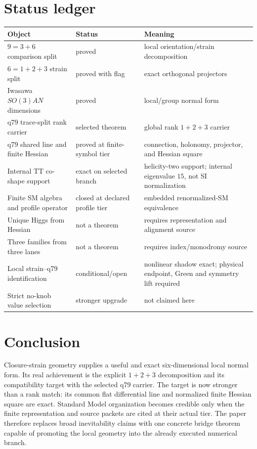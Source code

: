 \documentclass[11pt]{article}
\begin{document}
\section{Status ledger}

\begin{center}
\small
\renewcommand{\arraystretch}{1.16}
\begin{tabularx}{\textwidth}{@{}
 >{\raggedright\arraybackslash}p{}
 >{\raggedright\arraybackslash}p{}
 >{\raggedright\arraybackslash}X@{}}
\hline
Object & Status & Meaning\\
\hline
$9=3+6$ comparison split & proved & local orientation/strain decomposition\\
$6=1+2+3$ strain split & proved with flag & exact orthogonal projectors\\
Iwasawa $SO(3)AN$ dimensions & proved & local/group normal form\\
q79 trace-split rank carrier & selected theorem & global rank $1+2+3$ carrier\\
q79 shared line and finite Hessian & proved at finite-symbol tier & connection,
holonomy, projector, and Hessian square\\
Internal TT co-shape support & exact on selected branch & helicity-two support;
internal eigenvalue $15$, not SI normalization\\
Finite SM algebra and profile operator & closed at declared profile tier & embedded renormalized-SM equivalence\\
Unique Higgs from Hessian & not a theorem & requires representation and alignment source\\
Three families from three lanes & not a theorem & requires index/monodromy source\\
Local strain--q79 identification & conditional/open & nonlinear shadow exact;
physical endpoint, Green and symmetry lift required\\
Strict no-knob value selection & stronger upgrade & not claimed here\\
\hline
\end{tabularx}
\end{center}

\section{Conclusion}

Closure-strain geometry supplies a useful and exact six-dimensional local
normal form.  Its real achievement is the explicit $1+2+3$ decomposition and
its compatibility target with the selected q79 carrier. The target is now
stronger than a rank match: its common flat differential line and normalized
finite Hessian square are exact. Standard Model
organization becomes credible only when the finite representation and source
packets are cited at their actual tier.  The paper therefore replaces broad
inevitability claims with one concrete bridge theorem capable of promoting the
local geometry into the already executed numerical branch.
\end{document}
